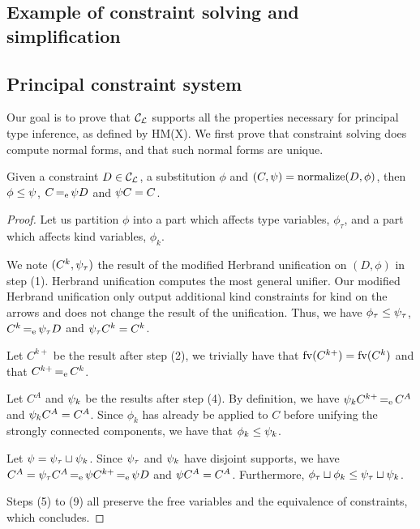 \subsection{Example of constraint solving and simplification}
\label{solving:example}



\subsection{Principal constraint system}

Our goal is to prove that ${\mathcal C_{\mathcal L}}$ supports all the properties necessary for
principal type inference, as defined by HM(X).
We first prove that constraint solving
does compute normal forms, and that such normal forms are unique.


\begin{lemma}
  \label{lemma:normalform}
  Given a constraint $D\in{\mathcal C_{\mathcal L}}$, a substitution $\phi$ and
  $(C,\mathrm{\psi}) = \operatorname{normalize}(D,\phi)$,
  then $\phi\leq\mathrm{\psi}$,
  $C \operatorname{=_e} \mathrm{\psi} D$ and
  $\mathrm{\psi} C = C$.
\end{lemma}
\begin{proof}
  Let us partition $\phi$ into a part which affects type variables,
  $\phi_\tau$, and a part which affects kind variables, $\phi_k$.

  We note $(C^k,\mathrm{\psi}_\tau)$ the result of
  the modified Herbrand unification on $(D,\phi)$ in step (1).
  Herbrand unification computes the most general
  unifier. Our modified Herbrand unification only output additional
  kind constraints for kind on the arrows and does not change
  the result of the unification. Thus, we have
  $\phi_\tau\leq\mathrm{\psi}_\tau$,
  $C^k \operatorname{=_e} \mathrm{\psi}_\tau D$ and
  $\mathrm{\psi}_\tau C^k = C^k$.

  Let $C^{k+}$ be the result after step (2), we trivially have that
  $\operatorname{fv}(C^{k+}) = \operatorname{fv}(C^k)$ and that $C^{k+} \operatorname{=_e} C^k$.

  Let $C^{A}$ and $\mathrm{\psi}_k$ be the results after step (4).
  By definition, we have $\mathrm{\psi}_k C^{k+} \operatorname{=_e} C^{A}$ and
  $\mathrm{\psi}_k C^{A} = C^{A}$. Since $\phi_k$ has already be applied to $C$ before
  unifying the strongly connected components,
  we have that $\phi_k\leq\mathrm{\psi}_k$.

  Let $\mathrm{\psi} = \mathrm{\psi}_\tau \sqcup \mathrm{\psi}_k$. Since $\mathrm{\psi}_\tau$ and $\mathrm{\psi}_k$
  have disjoint supports,
  we have $C^{A} = \mathrm{\psi}_\tau C^{A} \operatorname{=_e} \mathrm{\psi} C^{k+} \operatorname{=_e} \mathrm{\psi} D$
  and $\mathrm{\psi} C^{A} = C^{A}$.
  Furthermore, $\phi_\tau \sqcup \phi_k \leq \mathrm{\psi}_\tau \sqcup \mathrm{\psi}_k$.

  Steps (5) to (9) all preserve the free variables and the equivalence
  of constraints, which concludes.
\end{proof}

